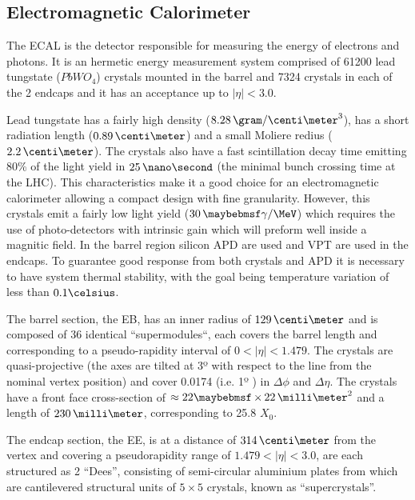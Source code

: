 \subsection{Electromagnetic Calorimeter}
\label{SUBSECTION:ExperimentalApparatus_CMS_ECAL}


The \gls{ECAL} is the detector responsible for measuring the energy of electrons and photons. It is an hermetic energy measurement system comprised of 61200 lead tungstate ($PbWO_4$) crystals mounted in the barrel and 7324 crystals in each of the 2 endcaps and it has an acceptance up to $|\eta|<3.0$.

Lead tungstate has a fairly high density ($8.28\,\gram/\centi\meter^3$), has a short radiation length ($0.89\,\centi\meter$) and a small Moliere redius ($2.2\,\centi\meter$). The crystals also have a fast scintillation decay time emitting 80\% of the light yield in $25\,\nano\second$ (the minimal bunch crossing time at the \gls{LHC}). This characteristics make it a good choice for an electromagnetic calorimeter allowing a compact design with fine granularity. However, this crystals emit a fairly low light yield ($30\,\gamma/\MeV$) which requires the use of photo-detectors with intrinsic gain which will preform well inside a magnitic field. In the barrel region silicon \gls{APD} are used and \gls{VPT} are used in the endcaps. To guarantee good response from both crystals and \gls{APD} it is necessary to have system thermal stability, with the goal being temperature variation of less than $0.1 \celsius$.

The barrel section, the \gls{EB}, has an inner radius of $129\,\centi\meter$ and is composed of 36 identical ``supermodules``, each covers the barrel length and corresponding to a pseudo-rapidity interval of $0<|\eta|<1.479$. The crystals are quasi-projective (the axes are tilted at 3º with respect to the line from the nominal vertex position) and cover 0.0174 (i.e. 1º ) in $\Delta\phi$ and $\Delta\eta$. The crystals have a front face cross-section of $\approx 22 \times 22\,\milli\meter^2$ and a length of $230\,\milli\meter$, corresponding to 25.8 $X_0$.

The endcap section, the \gls{EE}, is at a distance of $314\,\centi\meter$ from the vertex and covering a pseudorapidity range of $1.479<|\eta|<3.0$, are each structured as 2 “Dees”, consisting of semi-circular aluminium plates from which are cantilevered structural units of $5\times 5$ crystals, known as “supercrystals”.

